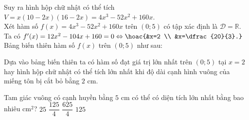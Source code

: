 \begin{ex}
{		Suy ra hình hộp chữ nhật có thể tích $V=x(10-2 x)(16-2 x)=4 x^{3}-52 x^{2}+160  x$.\\
		Xét hàm số $f(x)=4 x^{3}-52 x^{2}+160 x$ trên  $(0; 5)$ có tập xác định là $\mathscr{D}=\mathbb{R}$.\\
		Ta  có
		$f'(x)=12  x^{2}-104 x+160=0 \Leftrightarrow\hoac{&x=2 \\ &x=\dfrac{20}{3}.}$ \\
		Bảng biến thiên hàm số $f(x)$  trên $(0; 5)$ như sau:
		\begin{center}
		\end{center}
	Dựa vào bảng biến thiên ta có hàm số đạt giá trị lớn nhất trên $(0; 5)$ tại $x=2$  hay hình hộp chữ nhật có thể tích lớn nhất khi độ dài cạnh hình vuông của miếng tôn bị cắt bỏ bằng $2$ cm.}
\end{ex}

\begin{ex}%
	Tam giác vuông có cạnh huyền bằng $5$ cm  có thể có diện tích lớn nhất bằng bao nhiêu cm$^2$?
	\choice 
		{$25$} 
		 {$\dfrac{125}{4}$}
		{\True  $\dfrac{625}{4}$}
		 {$125$}
\end{ex}

